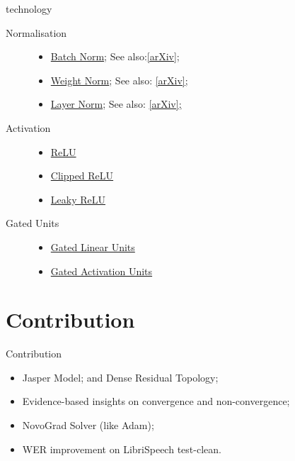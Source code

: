 \documentclass[aspectratio=169,xcolor={dvipsnames,svgnames}]{beamer}
\begin{document}
\begin{frame}[label={sec:technology}]{technology}
\begin{description}
\item[{Normalisation}] \begin{itemize}
\item \hyperlink{sec:batch-norm}{Batch Norm}; See also:\href{https://arxiv.org/abs/1502.03167}{[arXiv];}
\item \hyperlink{sec:weight-norm}{Weight Norm}; See also: \href{http://arxiv.org/abs/1602.07868}{[arXiv];}
\item \hyperlink{sec:layer-norm}{Layer Norm}; See also: \href{http://arxiv.org/abs/1607.06450}{[arXiv];}
\end{itemize}
\item[{Activation}] \begin{itemize}
\item \hyperlink{sec:org271b691}{ReLU}
\item \hyperlink{sec:org271b691}{Clipped ReLU}
\item \hyperlink{sec:org271b691}{Leaky ReLU}
\end{itemize}
\item[{Gated Units}] \begin{itemize}
\item \hyperlink{sec:gated-linear-unit}{Gated Linear Units}
\item \hyperlink{sec:gated-activation-unit}{Gated Activation Units}
\end{itemize}
\end{description}
\end{frame}

\section{Contribution}
\label{sec:org1ccaa5e}
\begin{frame}[label={sec:contribution}]{Contribution}
\begin{itemize}
\item Jasper Model; and Dense Residual Topology;
\item Evidence-based insights on convergence and
non-convergence;
\item NovoGrad Solver (like Adam);
\item WER improvement on LibriSpeech test-clean.
\end{itemize}
\end{frame}
\end{document}
